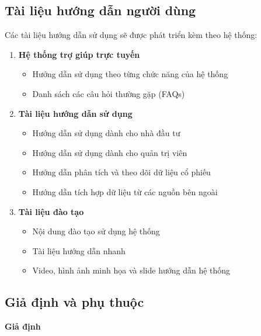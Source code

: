 \documentclass[12pt, a4paper]{article}
\begin{document}
\subsection{Tài liệu hướng dẫn người dùng}

Các tài liệu hướng dẫn sử dụng sẽ được phát triển kèm theo hệ thống:

\begin{enumerate}
    \renewcommand{\labelenumi}{\arabic{enumi})}

    \item \textbf{Hệ thống trợ giúp trực tuyến}
          \begin{itemize}
              \item Hướng dẫn sử dụng theo từng chức năng của hệ thống
              \item Danh sách các câu hỏi thường gặp (FAQs)
          \end{itemize}

    \item \textbf{Tài liệu hướng dẫn sử dụng}
          \begin{itemize}
              \item Hướng dẫn sử dụng dành cho nhà đầu tư
              \item Hướng dẫn sử dụng dành cho quản trị viên
              \item Hướng dẫn phân tích và theo dõi dữ liệu cổ phiếu
              \item Hướng dẫn tích hợp dữ liệu từ các nguồn bên ngoài
          \end{itemize}

    \item \textbf{Tài liệu đào tạo}
          \begin{itemize}
              \item Nội dung đào tạo sử dụng hệ thống
              \item Tài liệu hướng dẫn nhanh
              \item Video, hình ảnh minh họa và slide hướng dẫn hệ thống
          \end{itemize}

\end{enumerate}

\subsection{Giả định và phụ thuộc}

\noindent\textbf{Giả định}
\end{document}
